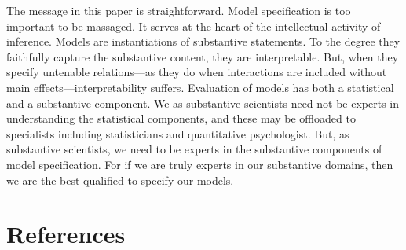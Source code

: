 \documentclass[
  english,
  ,man]{apa6}
\begin{document}
The message in this paper is straightforward. Model specification is too important to be massaged. It serves at the heart of the intellectual activity of inference. Models are instantiations of substantive statements. To the degree they faithfully capture the substantive content, they are interpretable. But, when they specify untenable relations---as they do when interactions are included without main effects---interpretability suffers. Evaluation of models has both a statistical and a substantive component. We as substantive scientists need not be experts in understanding the statistical components, and these may be offloaded to specialists including statisticians and quantitative psychologist. But, as substantive scientists, we need to be experts in the substantive components of model specification. For if we are truly experts in our substantive domains, then we are the best qualified to specify our models.

\newpage

\hypertarget{references}{%
\section*{References}\label{references}}
\end{document}
